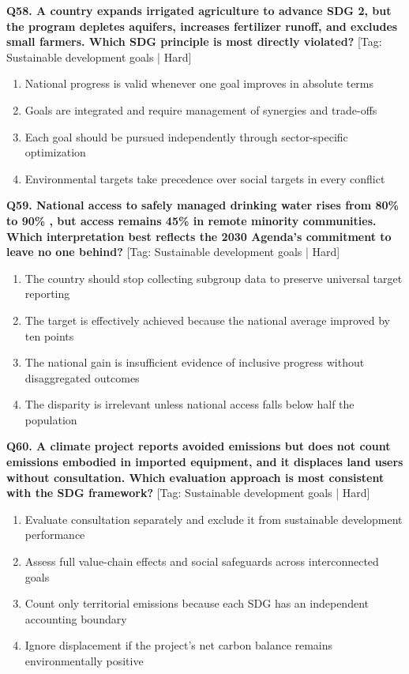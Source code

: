 \noindent\textbf{Q58. A country expands irrigated agriculture to advance SDG 2, but the program depletes aquifers, increases fertilizer runoff, and excludes small farmers. Which SDG principle is most directly violated?} \hfill [Tag: Sustainable development goals | Hard]
\begin{enumerate}[label=(\alph*),topsep=2pt,itemsep=1pt,partopsep=0pt,parsep=0pt]
    \item {National progress is valid whenever one goal improves in absolute terms}
    \item {Goals are integrated and require management of synergies and trade-offs}
    \item {Each goal should be pursued independently through sector-specific optimization}
    \item {Environmental targets take precedence over social targets in every conflict}
\end{enumerate}
\vspace{2mm}

\noindent\textbf{Q59. National access to safely managed drinking water rises from 80\% to 90\% , but access remains 45\% in remote minority communities. Which interpretation best reflects the 2030 Agenda's commitment to leave no one behind?} \hfill [Tag: Sustainable development goals | Hard]
\begin{enumerate}[label=(\alph*),topsep=2pt,itemsep=1pt,partopsep=0pt,parsep=0pt]
    \item {The country should stop collecting subgroup data to preserve universal target reporting}
    \item {The target is effectively achieved because the national average improved by ten points}
    \item {The national gain is insufficient evidence of inclusive progress without disaggregated outcomes}
    \item {The disparity is irrelevant unless national access falls below half the population}
\end{enumerate}
\vspace{2mm}

\noindent\textbf{Q60. A climate project reports avoided emissions but does not count emissions embodied in imported equipment, and it displaces land users without consultation. Which evaluation approach is most consistent with the SDG framework?} \hfill [Tag: Sustainable development goals | Hard]
\begin{enumerate}[label=(\alph*),topsep=2pt,itemsep=1pt,partopsep=0pt,parsep=0pt]
    \item {Evaluate consultation separately and exclude it from sustainable development performance}
    \item {Assess full value-chain effects and social safeguards across interconnected goals}
    \item {Count only territorial emissions because each SDG has an independent accounting boundary}
    \item {Ignore displacement if the project's net carbon balance remains environmentally positive}
\end{enumerate}
\vspace{2mm}


